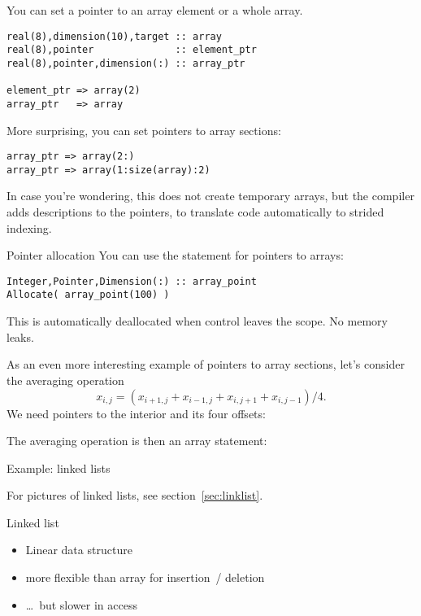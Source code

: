 You can set a pointer to an array element or a whole array.
\begin{lstlisting}
real(8),dimension(10),target :: array
real(8),pointer              :: element_ptr
real(8),pointer,dimension(:) :: array_ptr

element_ptr => array(2)
array_ptr   => array
\end{lstlisting}
More surprising, you can set pointers to array sections:
\begin{lstlisting}
array_ptr => array(2:)
array_ptr => array(1:size(array):2)
\end{lstlisting}

In case you're wondering, this does not create temporary arrays, but
the compiler adds descriptions to the pointers, to translate code
automatically to strided indexing.

\begin{block}{Pointer allocation}
  \label{sl:fpoint-dynamic}
  You can use the  statement for pointers to arrays:
\begin{lstlisting}
Integer,Pointer,Dimension(:) :: array_point
Allocate( array_point(100) )
\end{lstlisting}  
  This is automatically deallocated when control leaves the scope.
  No memory leaks.
\end{block}

As an even more interesting  example of pointers to array sections,
let's consider the averaging operation
\[ x_{i,j} = ( x_{i+1,j}+x_{i-1,j}+x_{i,j+1}+x_{i,j-1} )/4. \]
We need pointers to the interior and its four offsets:

The averaging operation is then an array statement:

 {Example: linked lists}
\label{sec:linkf}

For pictures of linked lists, see section~\ref{sec:linklist}.

\begin{block}{Linked list}
  \label{sl:flink1}
  \begin{itemize}
  \item Linear data structure
  \item more flexible than array for insertion~/ deletion
  \item \ldots~but slower in access
  \end{itemize}
\end{block}

